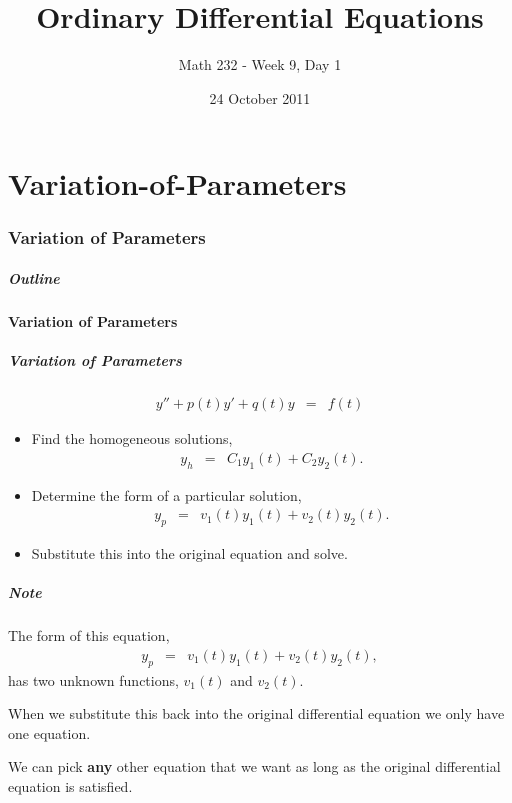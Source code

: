 \part{Variation-of-Parameters}
\section{Variation of Parameters}

\title{Ordinary Differential Equations}
\subtitle{Math 232 - Week 9, Day 1}
\date{24 October 2011}

\begin{frame}
  \titlepage
\end{frame}

\begin{frame}
  \frametitle{Outline}
\end{frame}


\subsection{Variation of Parameters}


\begin{frame}
  \frametitle{Variation of Parameters}

  \begin{eqnarray*}
    y'' + p(t) y' + q(t) y & = & f(t)
  \end{eqnarray*}

  \begin{itemize}
  \item Find the homogeneous solutions,
    \begin{eqnarray*}
      y_h & = & C_1 y_1(t) + C_2 y_2(t).
    \end{eqnarray*}
  \item Determine the form of a particular solution,
    \begin{eqnarray*}
      y_p & = & v_1(t) y_1(t) + v_2(t) y_2(t).
    \end{eqnarray*}
  \item Substitute this into the original equation and solve.
  \end{itemize}

\end{frame}


\begin{frame}
  \frametitle{Note}

  The form of this equation,
  \begin{eqnarray*}
    y_p & = & v_1(t) y_1(t) + v_2(t) y_2(t),
  \end{eqnarray*}
  has two unknown functions, $v_1(t)$ and $v_2(t)$.
  

  When we substitute this back into the original differential equation
  we only have one equation.

  We can pick \textbf{any} other equation that we want as long as the
  original differential equation is satisfied.

\end{frame}


